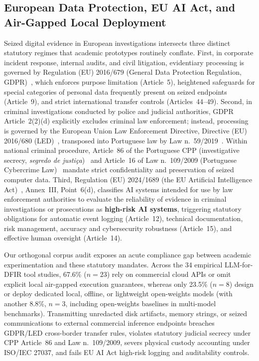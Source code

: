 \subsection{European Data Protection, EU AI Act, and Air-Gapped Local Deployment}
Seized digital evidence in European investigations intersects three distinct statutory regimes that academic prototypes routinely conflate. First, in corporate incident response, internal audits, and civil litigation, evidentiary processing is governed by Regulation (EU) 2016/679 (General Data Protection Regulation, GDPR)~\cite{gdpr2016}, which enforces purpose limitation (Article~5), heightened safeguards for special categories of personal data frequently present on seized endpoints (Article~9), and strict international transfer controls (Articles~44--49). Second, in criminal investigations conducted by police and judicial authorities, GDPR Article~2(2)(d) explicitly excludes criminal law enforcement; instead, processing is governed by the European Union Law Enforcement Directive, Directive (EU) 2016/680 (LED)~\cite{eu_led_2016}, transposed into Portuguese law by Law n.{\textordmasculine}~59/2019~\cite{portugal_lei59_2019}. Within national criminal procedure, Article~86 of the Portuguese CPP (investigative secrecy, \textit{segredo de justi{\c{c}}a})~\cite{portugal_cpp} and Article~16 of Law n.{\textordmasculine}~109/2009 (Portuguese Cybercrime Law)~\cite{leicibercrime2009} mandate strict confidentiality and preservation of seized computer data. Third, Regulation (EU) 2024/1689 (the EU Artificial Intelligence Act)~\cite{eu_ai_act_2024}, Annex~III, Point~6(d), classifies AI systems intended for use by law enforcement authorities to evaluate the reliability of evidence in criminal investigations or prosecutions as \textbf{high-risk AI systems}, triggering statutory obligations for automatic event logging (Article~12), technical documentation, risk management, accuracy and cybersecurity robustness (Article~15), and effective human oversight (Article~14).

Our orthogonal corpus audit exposes an acute compliance gap between academic experimentation and these statutory mandates. Across the 34 empirical LLM-for-DFIR tool studies, 67.6\% ($n=23$) rely on commercial cloud APIs or omit explicit local air-gapped execution guarantees, whereas only 23.5\% ($n=8$) design or deploy dedicated local, offline, or lightweight open-weights models (with another 8.8\%, $n=3$, including open-weights baselines in multi-model benchmarks). Transmitting unredacted disk artifacts, memory strings, or seized communications to external commercial inference endpoints breaches GDPR/LED cross-border transfer rules, violates statutory judicial secrecy under CPP Article~86 and Law n.{\textordmasculine}~109/2009, severs physical custody accounting under ISO/IEC 27037, and fails EU AI Act high-risk logging and auditability controls.

